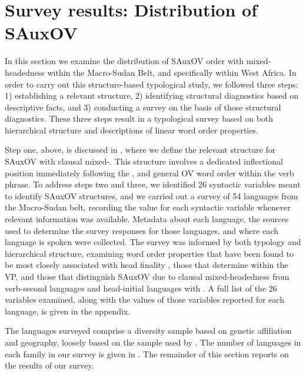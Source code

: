 \documentclass[output=paper,newtxmath,modfonts,nonflat,draftmode]{langsci/langscibook}
\begin{document}
\section{Survey results: Distribution of SAuxOV}\label{sec:distribution}

In this section we examine the distribution of SAuxOV order with mixed-head\-ed\-ness within the Macro-Sudan Belt, and specifically within West Africa. In order to carry out this structure-based typological study, we followed three steps: 1) establishing a relevant structure, 2) identifying structural diagnostics based on descriptive facts, and 3) conducting a survey on the basis of those structural diagnostics. These three steps result in a typological survey based on both hierarchical structure and descriptions of linear word order properties. 

Step one, above, is discussed in , where we define the relevant structure for SAuxOV with clausal mixed-. This structure involves a dedicated inflectional position immediately following the , and general OV word order within the verb phrase. To address steps two and three, we identified 26 syntactic variables meant to identify SAuxOV structures, and we carried out a survey of 54 languages from the Macro-Sudan belt, recording the value for each syntactic variable whenever relevant information was available. Metadata about each language, the sources used to determine the survey responses for those languages, and where each language is spoken were collected. The survey was informed by both typology and hierarchical structure, examining word order properties that have been found to be most closely associated with head finality \citep{dryer92, dryer07}, those that determine  within the VP, and those that distinguish SAuxOV due to clausal mixed-head\-ed\-ness  from verb-second languages and head-initial languages with . A full list of the 26 variables examined, along with the values of those variables reported for each language, is given in the appendix.

The languages surveyed comprise a diversity sample based on genetic affiliation and geography, loosely based on the sample used by \citet{clements08}. The number of languages in each family in our survey is given in . The remainder of this section reports on the results of our survey.
\end{document}
